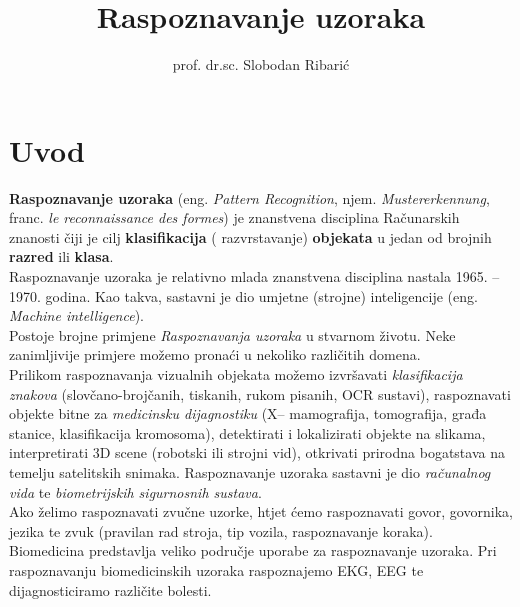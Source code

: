 \documentclass{book}
\title{Raspoznavanje uzoraka }
\author{ prof. dr.sc. Slobodan Ribarić }
\begin{document}
\maketitle

\tableofcontents 

\chapter{Uvod}

\indent \textbf{ Raspoznavanje uzoraka } (eng. \textit{ Pattern
Recognition}, njem. \textit{ Mustererkennung}, franc. \textit{le reconnaissance des formes})
je znanstvena disciplina Računarskih znanosti  čiji je cilj \textbf{
klasifikacija} ( razvrstavanje) \textbf{objekata} u jedan od brojnih \textbf{
razred} ili \textbf{ klasa}.  \\

\indent Raspoznavanje uzoraka je relativno mlada
znanstvena disciplina nastala 1965. -- 1970. godina. Kao takva, sastavni je dio
umjetne (strojne) inteligencije (eng. \textit{Machine intelligence}). \\


 Postoje brojne primjene
\textit{Raspoznavanja uzoraka} u stvarnom životu. Neke zanimljivije primjere možemo pronaći u nekoliko različitih domena. \\

Prilikom raspoznavanja vizualnih objekata možemo izvršavati
\textit{klasifikacija znakova} (slovčano-brojčanih, tiskanih, rukom pisanih,
OCR sustavi), raspoznavati objekte bitne za \textit{medicinsku dijagnostiku}
(X-- mamografija, tomografija, građa stanice, klasifikacija kromosoma),
detektirati i lokalizirati objekte na slikama, interpretirati 3D scene (robotski
ili strojni vid), otkrivati prirodna bogatstava na temelju satelitskih snimaka.
Raspoznavanje uzoraka sastavni je dio \textit{računalnog vida} te
\textit{biometrijskih sigurnosnih sustava}. \\
    
Ako želimo raspoznavati zvučne uzorke, htjet ćemo raspoznavati govor, govornika,
jezika te zvuk (pravilan rad stroja, tip vozila, raspoznavanje koraka). \\
  
Biomedicina predstavlja veliko područje uporabe za raspoznavanje uzoraka.
Pri raspoznavanju biomedicinskih uzoraka raspoznajemo EKG, EEG te
dijagnosticiramo različite bolesti. \\
\end{document}

